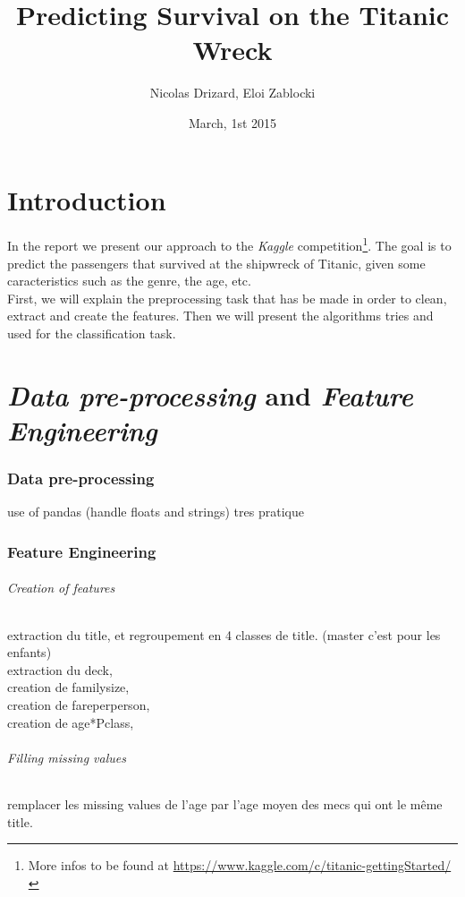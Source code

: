 \documentclass[11pt,a4paper,portrait]{article}
\author{Nicolas Drizard, Eloi Zablocki}
\date{March, 1st 2015}
\title{Predicting Survival on the Titanic Wreck}
\begin{document}
\maketitle


\newpage
\part*{Introduction}
In the report we present our approach to the \textit{Kaggle} competition\footnote{More infos to be found at \url{https://www.kaggle.com/c/titanic-gettingStarted/}}. The goal is to predict the passengers that survived at the shipwreck of Titanic, given some caracteristics such as the genre, the age, etc.\\
First, we will explain the preprocessing task that has be made in order to clean, extract and create the features. Then we will present the algorithms tries and used for the classification task.

\part{\textit{Data pre-processing} and \textit{Feature Engineering}}
\setcounter{section}{0}


\section{Data pre-processing}

use of pandas (handle floats and strings)
tres pratique

\section{Feature Engineering}

\paragraph{Creation of features}
extraction du title, et regroupement en 4 classes de title. (master c'est pour les enfants)\\
extraction du deck,\\
creation de familysize,\\
creation de fareperperson,\\
creation de age*Pclass,\\


\paragraph{Filling missing values}
remplacer les missing values de l'age par l'age moyen des mecs qui ont le même title.
\end{document}
